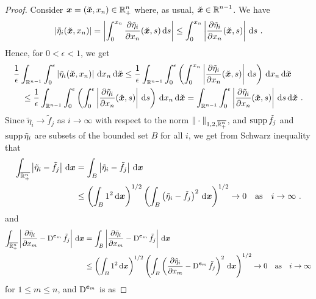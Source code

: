 \begin{proof}
Consider $\displaystyle {\bm{x}} = (\breve{{\bm{x}}}, x_n) \in \mathbb{R}^n_+$ where, as
usual, $\displaystyle \breve{{\bm{x}}} \in \mathbb{R}^{n-1}$.  We have
\[
\left| \tilde{\eta}_i(\breve{{\bm{x}}}, x_n) \right|
= \left| \int_0^{x_n} \frac{\partial{\tilde{\eta}_i}}{\partial x_n}(\breve{{\bm{x}}},s)
\,\mathrm{d}{s} \right|
\leq \int_0^{x_n} \left| \frac{\partial{\tilde{\eta}_i}}{\partial x_n}(\breve{{\bm{x}}},s)
\right| \,\mathrm{d}{s} \ .
\]
Hence, for $0< \epsilon<1$, we get
\begin{align}
& \frac{1}{\epsilon} \int_{\mathbb{R}^{n-1}} \int_0^\epsilon
\left| \tilde{\eta}_i(\breve{{\bm{x}}}, x_n) \right| \,\mathrm{d}{x_n}
\,\mathrm{d}{\breve{{\bm{x}}}}
\leq \frac{1}{\epsilon} \int_{\mathbb{R}^{n-1}} \int_0^\epsilon \left(
\int_0^{x_n} \left| \frac{\partial{\tilde{\eta}_i}}{\partial x_n}(\breve{{\bm{x}}},s)
\right| \,\mathrm{d}{s} \right) \,\mathrm{d}{x_n} \,\mathrm{d}{\breve{{\bm{x}}}} \nonumber \\
&\quad \leq \frac{1}{\epsilon} \int_{\mathbb{R}^{n-1}} \int_0^\epsilon \left(
\int_0^\epsilon \left| \frac{\partial{\tilde{\eta}_i}}{\partial x_n}(\breve{{\bm{x}}},s)
\right| \,\mathrm{d}{s}
\right) \,\mathrm{d}{x_n} \,\mathrm{d}{\breve{{\bm{x}}}} = \int_{\mathbb{R}^{n-1}} \int_0^\epsilon
\left| \frac{\partial{\tilde{\eta}_i}}{\partial x_n}(\breve{{\bm{x}}},s) \right| \,\mathrm{d}{s}
\,\mathrm{d}{\breve{{\bm{x}}}} \ .
\label{sob_Wz_Cz}
\end{align}
Since $\tilde{\eta}_i \rightarrow \tilde{f}_j$ as $i\rightarrow \infty$ with
respect to the norm $\displaystyle \|\cdot\|_{1,2,\overline{\mathbb{R}^n_+}}$,
and $\operatorname{supp} \tilde{f}_j$ and 
$\operatorname{supp} \tilde{\eta}_i$ are subsets of the bounded set $B$ for all $i$,
we get from Schwarz inequality that
\begin{align*}
\int_{\overline{\RR^n_+}} \left| \tilde{\eta}_i - \tilde{f}_j\right| \dx{\VEC{x}} 
&= \int_B \left| \tilde{\eta}_i - \tilde{f}_j\right| \dx{\VEC{x}} \\
&\leq \left(\int_B 1^2 \dx{\VEC{x}}\right)^{1/2}
\left( \int_B \left( \tilde{\eta}_i - \tilde{f}_j\right)^2 \dx{\VEC{x}} 
\right)^{1/2} \rightarrow 0 \quad \text{as} \quad i\rightarrow \infty \ .
\end{align*}
and
\begin{align*}
\int_{\overline{\mathbb{R}^n_+}} \left| \frac{\partial{\tilde{\eta}_i}}{\partial x_m} -
\operatorname{D}^{{\bm{e}}_m}\tilde{f}_j\right| \,\mathrm{d}{{\bm{x}}} &=
\int_B \left| \frac{\partial{\tilde{\eta}_i}}{\partial x_m} - \operatorname{D}^{{\bm{e}}_m}\tilde{f}_j\right|
\,\mathrm{d}{{\bm{x}}} \\
&\leq \left(\int_B 1^2 \,\mathrm{d}{{\bm{x}}}\right)^{1/2}
\left( \int_B \left( \frac{\partial{\tilde{\eta}_i}}{\partial x_m} -
\operatorname{D}^{{\bm{e}}_m}\tilde{f}_j \right)^2 \,\mathrm{d}{{\bm{x}}} 
\right)^{1/2} \rightarrow 0 \quad \text{as} \quad i\rightarrow \infty
\end{align*}
for $1 \leq m \leq n$, and $\displaystyle \operatorname{D}^{{\bm{e}}_m}$ is as

\end{proof}
